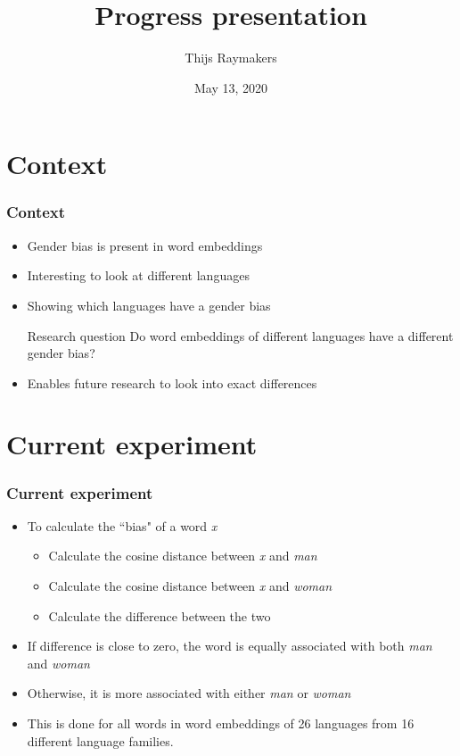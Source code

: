 \documentclass[handout]{beamer}
\author{Thijs Raymakers}
\title{Progress presentation}
\date{May 13, 2020}
\begin{document}
\begin{frame}
    \titlepage
\end{frame}

\section{Context}
\begin{frame}
\frametitle{Context}
\begin{itemize}
    \item Gender bias is present in word embeddings~
    \pause
    \item Interesting to look at different languages
    \pause
    \item Showing which languages have a gender bias
    \pause
    \begin{block}{Research question}
        Do word embeddings of different languages have a different gender bias?
    \end{block}
    \pause
    \item Enables future research to look into exact differences
\end{itemize}
\end{frame}

\section{Current experiment}
\begin{frame}
    \frametitle{Current experiment}
    \begin{itemize}
        \item To calculate the ``bias" of a word \textit{x}
        \begin{itemize}
            \item Calculate the cosine distance between \textit{x} and \textit{man}
            \item Calculate the cosine distance between \textit{x} and \textit{woman}
            \item Calculate the difference between the two 
        \end{itemize}
        \pause
        \item If difference is close to zero, the word is equally associated with both \textit{man} and \textit{woman}
        \item Otherwise, it is more associated with either \textit{man} or \textit{woman}
        \pause
        \item This is done for all words in word embeddings of 26 languages from 16 different language families.
    \end{itemize}
\end{frame}
\end{document}
